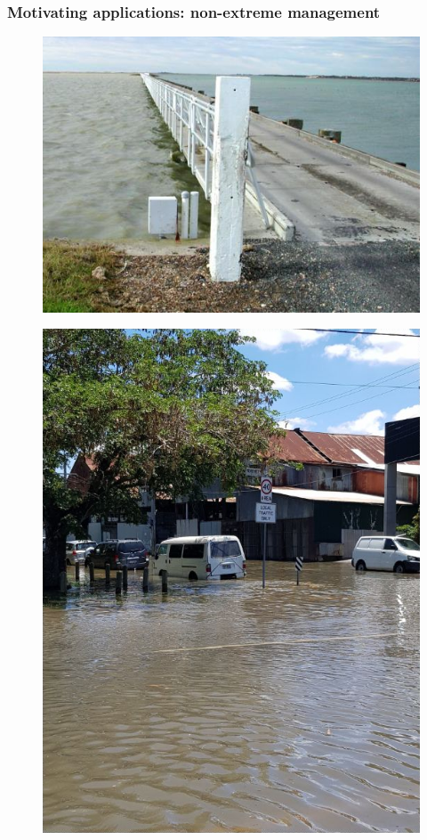\begin{frame}
\frametitle{Motivating applications: non-extreme management}
\begin{minipage}{0.45\textwidth}
    \begin{figure}      
    \includegraphics[width=\textwidth]{figures/images/goolwa_ewe_island-environment_sa_gov_au.jpg}
    \end{figure}
\end{minipage}
\hfill
\begin{minipage}{0.45\textwidth}
    \begin{figure}      
     \includegraphics[width=\textwidth]{figures/images/sunnyFlood_ClarkJan2018Brisbane.png}
    \end{figure} 
\end{minipage}


\end{frame}
